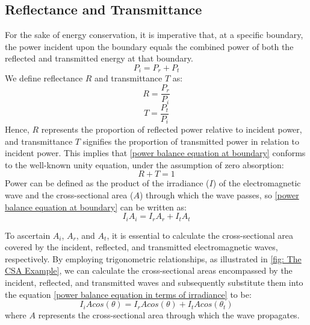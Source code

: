 \subsection{Reflectance and Transmittance}
For the sake of energy conservation, it is imperative that, at a specific boundary, the power incident upon the boundary equals the combined power of both the reflected and transmitted energy at that boundary.
\begin{equation} \label{power balance equation at boundary}
P_i = P_r + P_t
\end{equation}
We define reflectance $R$ and transmittance $T$ as:
\begin{equation} \label{Reflectance}
R = \frac{P_r}{P_i}
\end{equation}
\begin{equation} \label{Transmittance}
T = \frac{P_t}{P_i}
\end{equation}
Hence, $R$ represents the proportion of reflected power relative to incident power, and transmittance $T$ signifies the proportion of transmitted power in relation to incident power. This implies that \ref{power balance equation at boundary} conforms to the well-known unity equation, under the assumption of zero absorption:
\begin{equation} \label{R+T=1}
R + T = 1
\end{equation}
Power can be defined as the product of the irradiance ($I$) of the electromagnetic wave and the cross-sectional area ($A$) through which the wave passes, so \ref{power balance equation at boundary} can be written as:
\begin{equation} \label{power balance equation in terms of irradiance}
I_iA_i = I_rA_r + I_tA_t
\end{equation}

To ascertain $A_i$, $A_r$, and $A_t$, it is essential to calculate the cross-sectional area covered by the incident, reflected, and transmitted electromagnetic waves, respectively. By employing trigonometric relationships, as illustrated in \ref{fig: The CSA Example}, we can calculate the cross-sectional areas encompassed by the incident, reflected, and transmitted waves and subsequently substitute them into the equation \ref{power balance equation in terms of irradiance} to be:
\begin{equation} \label{power balance equations after CSA substitution}
I_iAcos(\theta) = I_rAcos(\theta) + I_tAcos(\theta_t)
\end{equation}
where $A$ represents the cross-sectional area through which the wave propagates.

